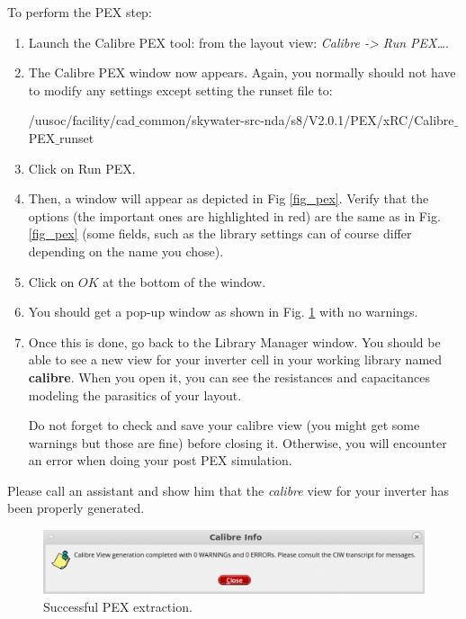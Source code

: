 \parbox[t]{\dimexpr\textwidth-\leftmargin}{%
	To perform the PEX step:
	\begin{enumerate}
		\item Launch the Calibre PEX tool: from the layout view: \textit{Calibre -> Run PEX…}.
		\item The Calibre PEX window now appears. Again, you normally should not have to modify any settings except setting the runset file to:
		
		\begin{codeline}
			/uusoc/facility/cad$\_$common/skywater-src-nda/s8/V2.0.1/PEX/xRC/Calibre$\_$PEX$\_$runset
		\end{codeline}

		\item Click on Run PEX.
		\item Then, a window will appear as depicted in Fig \ref{fig_pex}. Verify that the options (the important ones are highlighted in red) are the same as in Fig. \ref{fig_pex} (some fields, such as the library settings can of course differ depending on the name you chose).
		\item Click on $OK$ at the bottom of the window.
		\item You should get a pop-up window as shown in Fig. \ref{fig_pex_good} with no warnings.
		\item Once this is done, go back to the Library Manager window. You should be able to see a new view for your inverter cell in your working library named \textbf{calibre}. When you open it, you can see the resistances and capacitances modeling the parasitics of your layout.
		\begin{remark}
			Do not forget to check and save your calibre view (you might get some warnings but those are fine) before closing it. Otherwise, you will encounter an error when doing your post PEX simulation.
			\end{remark}
\end{enumerate}}

\begin{checkpoint}\label{check2}
	Please call an assistant and show him that the \textit{calibre} view for your inverter has been properly generated.
\end{checkpoint}


\begin{figure}[!h]
	\centering
	\includegraphics[scale=0.6]{figures/lab2_layout/pex_good}
	\caption{Successful PEX extraction.}
	\label{fig_pex_good}
\end{figure}

